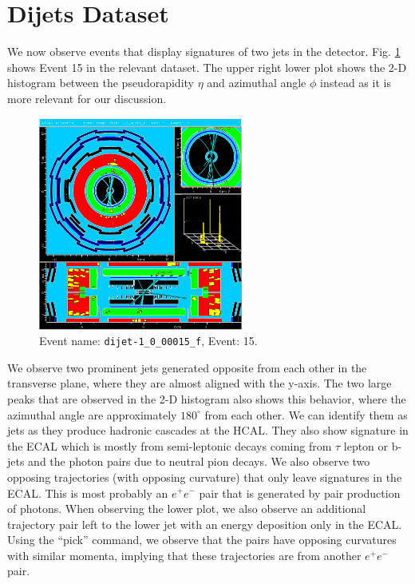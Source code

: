 \documentclass[a4paper]{report}
\numberwithin{equation}{section}
\begin{document}
\section{Dijets Dataset}

We now observe events that display signatures of two jets in the detector. Fig. \ref{fig:dijets} shows Event 15 in the relevant dataset. 
The upper right lower plot shows the 2-D histogram between the pseudorapidity $\eta$ and azimuthal angle $\phi$ instead as it is more 
relevant for our discussion.

\begin{figure}[htpb]
    \centering
    \includegraphics[width=0.6\textwidth]{dijet_event15.eps}
    \caption{Event name: \texttt{dijet-1\_0\_00015\_f}, Event: 15. }
    \label{fig:dijets}
\end{figure}

We observe two prominent jets generated opposite from each other in the transverse plane, where they are almost aligned with the y-axis.
 The two large peaks that are observed in the 2-D histogram also shows this behavior, where the azimuthal angle are approximately $180^\circ$ from each other. We can 
identify them as jets as they produce hadronic cascades at the HCAL. They also show signature in the ECAL which is mostly from semi-leptonic decays coming from $\tau$ lepton or b-jets and the photon
pairs due to neutral pion decays. We also observe two opposing trajectories (with opposing curvature) that only leave signatures
 in the ECAL. This is most probably an $e^+e^-$ pair that is generated by pair production of photons. When observing the lower plot, 
 we also observe an additional trajectory pair left to the lower jet with an energy deposition only in the ECAL.
  Using the ``pick'' command, we observe that the pairs have opposing curvatures with similar momenta, implying that these trajectories
  are from another $e^+e^-$ pair. 
\end{document}

